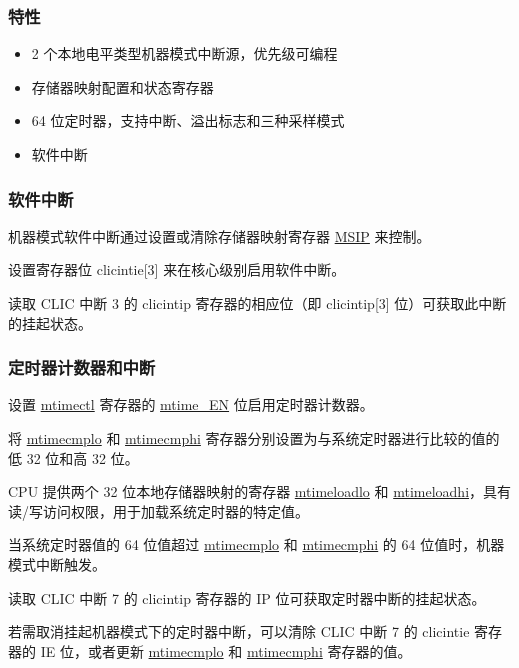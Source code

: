 \documentclass[main\_\_CN.tex]{subfiles}
\begin{document}
\subsubsection{特性}
\begin{itemize}
\item 2 个本地电平类型机器模式中断源，优先级可编程
\item 存储器映射配置和状态寄存器
\item 64 位定时器，支持中断、溢出标志和三种采样模式
\item 软件中断
\end{itemize}

\subsubsection{软件中断}
\label{sec:riscvcpu-clint-software}

机器模式软件中断通过设置或清除存储器映射寄存器 \hyperref[regdesc:CLINTMSIPREG]{MSIP} 来控制。

设置寄存器位 clicintie[3] 来在核心级别启用软件中断。

读取 CLIC 中断 3 的 clicintip 寄存器的相应位（即 clicintip[3] 位）可获取此中断的挂起状态。


\subsubsection{定时器计数器和中断}
\label{sec:riscvcpu-clint-timer}

设置 \hyperref[regdesc:CLINTMTIMECTLREG]{mtimectl} 寄存器的 \hyperref[fielddesc:CLINTMTIMECTLEN]{mtime\_EN} 位启用定时器计数器。

将 \hyperref[regdesc:CLINTMTIMECMPLOREG]{mtimecmplo} 和 \hyperref[regdesc:CLINTMTIMECMPHIREG]{mtimecmphi} 寄存器分别设置为与系统定时器进行比较的值的低 32 位和高 32 位。

CPU 提供两个 32 位本地存储器映射的寄存器 \hyperref[regdesc:CLINTMTIMELOADLOREG]{mtimeloadlo} 和 \hyperref[regdesc:CLINTMTIMELOADHIREG]{mtimeloadhi}，具有读/写访问权限，用于加载系统定时器的特定值。

当系统定时器值的 64 位值超过 \hyperref[regdesc:CLINTMTIMECMPLOREG]{mtimecmplo} 和 \hyperref[regdesc:CLINTMTIMECMPHIREG]{mtimecmphi} 的 64 位值时，机器模式中断触发。

读取 CLIC 中断 7 的 clicintip 寄存器的 IP 位可获取定时器中断的挂起状态。

若需取消挂起机器模式下的定时器中断，可以清除 CLIC 中断 7 的 clicintie 寄存器的 IE 位，或者更新 \hyperref[regdesc:CLINTMTIMECMPLOREG]{mtimecmplo} 和 \hyperref[regdesc:CLINTMTIMECMPHIREG]{mtimecmphi} 寄存器的值。
\end{document}
